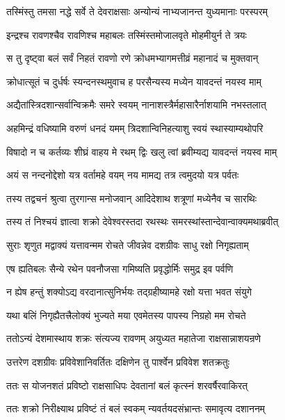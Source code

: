 \twolineshloka
{तस्मिंस्तु तमसा नद्धे सर्वे ते देवराक्षसाः}
{अन्योन्यं नाभ्यजानन्त युध्यमानाः परस्परम्} %

\twolineshloka
{इन्द्रश्च रावणश्चैव रावणिश्च महाबलः}
{तस्मिंस्तमोजालवृते मोहमीयुर्न ते त्रयः} %

\twolineshloka
{स तु दृष्ट्वा बलं सर्वं निहतं रावणो रणे}
{क्रोधमभ्यागमत्तीव्रं महानादं च मुक्तवान्} %

\twolineshloka
{क्रोधात्सूतं च दुर्धर्षः स्यन्दनस्थमुवाच ह}
{परसैन्यस्य मध्येन यावदन्तं नयस्व माम्} %

\twolineshloka
{अद्यैतांस्त्रिदशान्सर्वान्विक्रमैः समरे स्वयम्}
{नानाशस्त्रैर्महासारैर्नाशयामि नभस्तलात्} %

\twolineshloka
{अहमिन्द्रं वधिष्यामि वरुणं धनदं यमम्}
{त्रिदशान्विनिहत्याशु स्वयं स्थास्याम्यथोपरि} %

\twolineshloka
{विषादो न च कर्तव्यः शीघ्रं वाहय मे रथम्}
{द्विः खलु त्वां ब्रवीम्यद्य यावदन्तं नयस्व माम्} %

\twolineshloka
{अयं स नन्दनोद्देशो यत्र वर्तामहे वयम्}
{नय मामद्य तत्र त्वमुदयो यत्र पर्वतः} %

\twolineshloka
{तस्य तद्वचनं श्रुत्वा तुरगान्स मनोजवान्}
{आदिदेशाथ शत्रूणां मध्येनैव च सारथिः} %

\twolineshloka
{तस्य तं निश्चयं ज्ञात्वा शक्रो देवेश्वरस्तदा}
{रथस्थः समरस्थांस्तान्देवान्वाक्यमथाब्रवीत्} %

\twolineshloka
{सुराः शृणुत मद्वाक्यं यत्तावन्मम रोचते}
{जीवन्नेव दशग्रीवः साधु रक्षो निगृह्यताम्} %

\twolineshloka
{एष ह्यतिबलः सैन्ये रथेन पवनौजसा}
{गमिष्यति प्रवृद्धोर्मिः समुद्र इव पर्वणि} %

\twolineshloka
{न ह्येष हन्तुं शक्योऽद्य वरदानात्सुनिर्भयः}
{तद्ग्रहीष्यामहे रक्षो यत्ता भवत संयुगे} %

\twolineshloka
{यथा बलिं निगृह्यैतत्त्रैलोक्यं भुज्यते मया}
{एवमेतस्य पापस्य निग्रहो मम रोचते} %

\twolineshloka
{ततोऽन्यं देशमास्थाय शक्रः संत्यज्य रावणम्}
{अयुध्यत महातेजा राक्षसान्नाशयन्रणे} %

\twolineshloka
{उत्तरेण दशग्रीवः प्रविवेशानिवर्तितः}
{दक्षिणेन तु पार्श्वेन प्रविवेश शतक्रतुः} %

\twolineshloka
{ततः स योजनशतं प्रविष्टो राक्षसाधिपः}
{देवतानां बलं कृत्स्नं शरवर्षैरवाकिरत्} %

\twolineshloka
{ततः शक्रो निरीक्ष्याथ प्रविष्टं तं बलं स्वकम्}
{न्यवर्तयदसंभ्रान्तः समावृत्य दशाननम्} %

